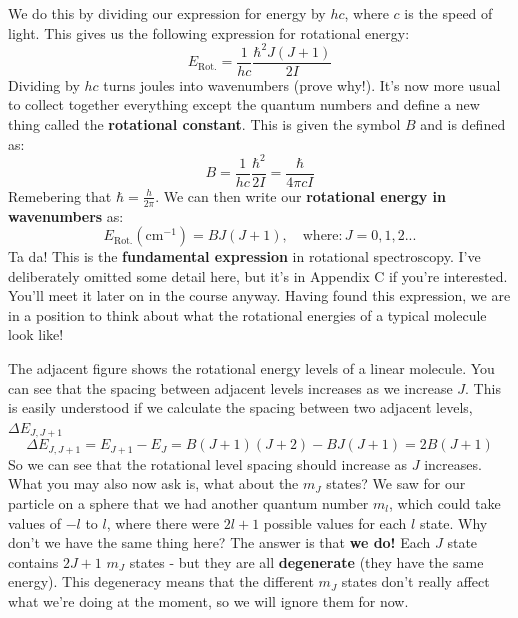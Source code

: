 \documentclass{memoir}[11pt,oneside,a4paper,openany]
\begin{document}
We do this by dividing our expression for energy by $hc$, where $c$ is the speed of light. This gives us the following expression for rotational energy:
\begin{equation}
	E_{\text{Rot.}} = \frac{1}{hc}\frac{\hbar^2J(J+1)}{2I}
\end{equation}
Dividing by $hc$ turns joules into wavenumbers (prove why!). It's now more usual to collect together everything except the quantum numbers and define a new thing called the \textbf{rotational constant}. This is given the symbol $B$ and is defined as:
\begin{equation}
	B = \frac{1}{hc}\frac{\hbar^2}{2I} = \frac{\hbar}{4\pi cI}
\end{equation}
Remebering that $\hbar = \frac{h}{2\pi}$. We can then write our \textbf{rotational energy in wavenumbers} as:
\begin{equation}
	E_{\text{Rot.}}(\text{cm}^{-1}) = BJ(J+1),\quad \text{where:}\, J = 0,1,2...
\end{equation}
Ta da! This is the \textbf{fundamental expression} in rotational spectroscopy. I've deliberately omitted some detail here, but it's in Appendix C if you're interested. You'll meet it later on in the course anyway. Having found this expression, we are in a position to think about what the rotational energies of a typical molecule look like! 

The adjacent figure shows the rotational energy levels of a linear molecule. You can see that the spacing between adjacent levels increases as we increase $J$. This is easily understood if we calculate the spacing between two adjacent levels, $\Delta E_{J,J+1}$
\begin{equation}
	\Delta E_{J,J+1} = E_{J+1}-E_J = B(J+1)(J+2)-BJ(J+1) = 2B(J+1)
\end{equation}
So we can see that the rotational level spacing should increase as $J$ increases. What you may also now ask is, what about the $m_J$ states? We saw for our particle on a sphere that we had another quantum number $m_l$, which could take values of $-l$ to $l$, where there were $2l+1$ possible values for each $l$ state. Why don't we have the same thing here? The answer is that \textbf{we do!} Each $J$ state contains $2J+1$ $m_J$ states - but they are all \textbf{degenerate} (they have the same energy). This degeneracy means that the different $m_J$ states don't really affect what we're doing at the moment, so we will ignore them for now.
\end{document}
